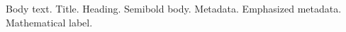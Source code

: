 \documentclass{article}
\begin{document}
Body text.
{\diakosmosTitleFont Title.}
{\diakosmosHeadingFont Heading.}
{\diakosmosBodySemibold Semibold body.}
{\diakosmosKickerFont Metadata.}
{\diakosmosKickerBold Emphasized metadata.}
{\diakosmosMathTextFont Mathematical label.}
\end{document}

